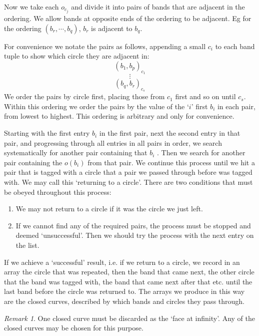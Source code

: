 \documentclass[10pt,a4paper]{report}
\theoremstyle{definition}
\theoremstyle{remark}
\newtheorem*{remark}{Remark}
\theoremstyle{example}
\begin{document}
 Now we take each $o_{c_j}$ and divide it into pairs of bands that are adjacent in the ordering. We allow bands at opposite ends of the ordering to be adjacent. Eg for the ordering $(b_r, \cdots, b_q)$, $b_r$ is adjacent to $b_q$.
 
 For convenience we notate the pairs as follows, appending a small $c_i$ to each band tuple to show which circle they are adjacent in:
\begin{equation*}
(b_1,b_p)_{c_1}
\end{equation*}
\begin{equation*}
\vdots
\end{equation*}
\begin{equation*}
(b_q,b_r)_{c_s}
\end{equation*}
 We order the pairs by circle first, placing those from $c_1$ first and so on until $c_s$. Within this ordering we order the pairs by the value of the `$i$' first $b_i$ in each pair, from lowest to highest. This ordering is arbitrary and only for convenience.
 
 Starting with the first entry $b_i$ in the first pair, next the second entry in that pair, and progressing through all entries in all pairs in order, we search systematically for another pair containing that $b_i$ . Then we search for another pair containing the $o(b_i)$ from that pair. We continue this process until we hit a pair that is tagged with a circle that a pair we passed through before was tagged with. We may call this `returning to a circle'. There are two conditions that must be obeyed throughout this process:
 \begin{enumerate}
 \item We may not return to a circle if it was the circle we just left.
 \item If we cannot find any of the required pairs, the process must be stopped and deemed `unsuccessful'. Then we should try the process with the next entry on the list.
 \end{enumerate}
If we achieve a `successful' result, i.e. if we return to a circle, we record in an array the circle that was repeated, then the band that came next, the other circle that the band was tagged with, the band that came next after that etc. until the last band before the circle was returned to. The arrays we produce in this way are the closed curves, described by which bands and circles they pass through. 
\begin{remark}
One closed curve must be discarded as the `face at infinity'. Any of the closed curves may be chosen for this purpose.
\end{remark}
\end{document}

